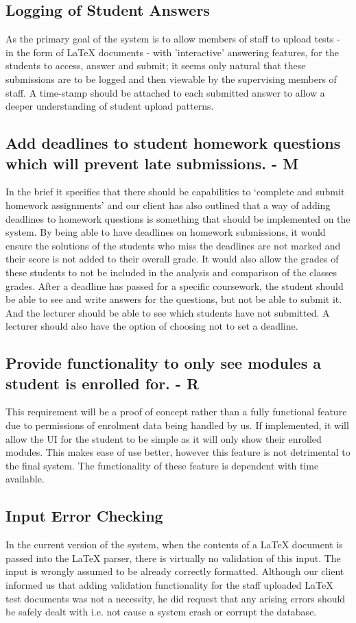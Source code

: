 \documentclass[12pt]{article}
\begin{document}
	\subsection{Logging of Student Answers}
	As the primary goal of the system is to allow members of staff to upload tests - in the form of LaTeX documents - with 'interactive' answering features, for the students to access, answer and submit; it seems only natural that these submissions are to be logged and then viewable by the supervising members of staff. A time-stamp should be attached to each submitted answer to allow a deeper understanding of student upload patterns.
	\subsection{Add deadlines to student homework questions which will prevent late submissions. - M}
	In the brief it specifies that there should be capabilities to ‘complete and submit homework assignments’ and our client has also outlined that a way of adding deadlines to homework questions is something that should be implemented on the system.
By being able to have deadlines on homework submissions, it would ensure the solutions of the students who miss the deadlines are not marked and their score is not added to their overall grade. It would also allow the grades of these students to not be included in the analysis and comparison of the classes grades.
After a deadline has passed for a specific coursework, the student should be able to see and write answers for the questions, but not be able to submit it.  And the lecturer should be able to see which students have not submitted.
A lecturer should also have the option of choosing not to set a deadline.

	\subsection{Provide functionality to only see modules a student is enrolled for. - R}
	This requirement will be a proof of concept rather than a fully functional feature due to  permissions of enrolment data being handled by us. If implemented, it will allow the UI for the student to be simple as it will only show their enrolled modules. This makes ease of use better, however this feature is not detrimental to the final system. The functionality of these feature is dependent with time available.
	\subsection{Input Error Checking}
	In the current version of the system, when the contents of a LaTeX document is passed into the LaTeX parser, there is virtually no validation of this input. The input is wrongly assumed to be already correctly formatted. Although our client informed us that adding validation functionality for the staff uploaded LaTeX test documents was not a necessity, he did request that any arising errors should be safely dealt with i.e. not cause a system crash or corrupt the database.
\end{document}
